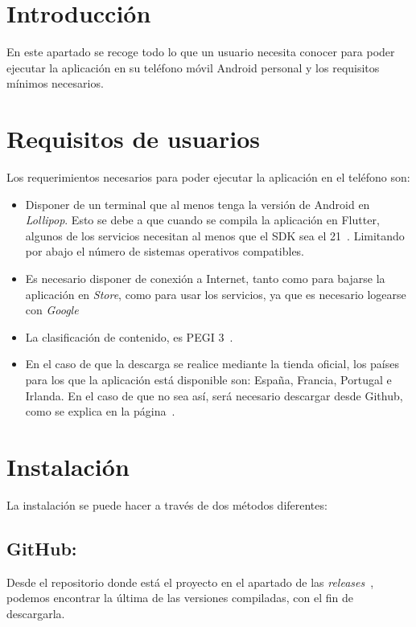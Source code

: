 
\section{Introducción}\label{manualusuario}
En este apartado se recoge todo lo que un usuario necesita conocer para poder ejecutar la aplicación en su teléfono móvil Android personal y los requisitos mínimos necesarios.

\section{Requisitos de usuarios}
Los requerimientos necesarios para poder ejecutar la aplicación en el teléfono son:
\begin{itemize}
	\tightlist
	\item
	Disponer de un terminal que al menos tenga la versión de Android en \emph{Lollipop}. Esto se debe a que cuando se compila la aplicación en Flutter, algunos de los servicios necesitan al menos que el SDK sea el 21~\cite{wiki:versionAndroid}. Limitando por abajo el número de sistemas operativos compatibles.
	\item
	Es necesario disponer de conexión a Internet, tanto como para bajarse la aplicación en \emph{Store}, como para usar los servicios, ya que es necesario logearse con \emph{Google}
	\item La clasificación de contenido, es PEGI 3~\cite{wiki:pegi}. 
	\item En el caso de que la descarga se realice mediante la tienda oficial, los países para los que la aplicación está disponible son: España, Francia, Portugal e Irlanda. En el caso de que no sea así, será necesario descargar desde Github, como se explica en la página~\pageref{descargaGit}.
\end{itemize}

\section{Instalación}
La instalación se puede hacer a través de dos métodos diferentes:

\subsection{GitHub:}\label{descargaGit}
Desde el repositorio donde está el proyecto en el apartado de las \emph{releases}~\cite{github:releases}, podemos encontrar la última de las versiones compiladas, con el fin de descargarla.

